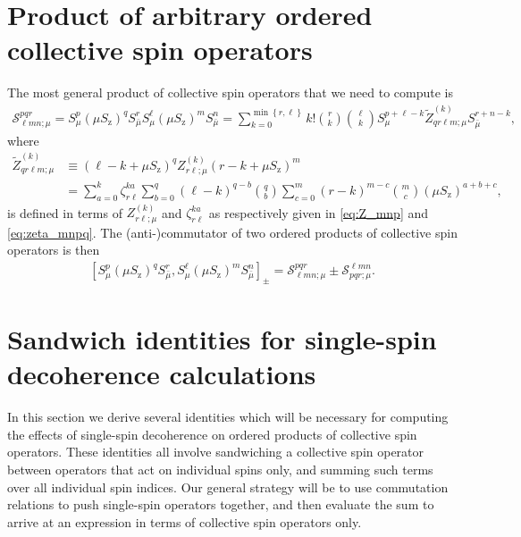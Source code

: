 \documentclass[aps,11pt,notitlepage,nofootinbib,longbibliography]{revtex4-1}
\newcommand{\p}[1]{\left(#1\right)} %
\renewcommand{\sp}[1]{\left[#1\right]} %
\renewcommand{\set}[1]{\left\{#1\right\}} %
\renewcommand{\S}{\mathcal{S}}
\newcommand{\z}{\text{z}}
\newcommand{\bmu}{{\bar\mu}}
\newcommand{\1}{\mathds{1}}
\begin{document}
\section{Product of arbitrary ordered collective spin operators}
\label{sec:prod_general}

The most general product of collective spin operators that we need to
compute is
\begin{align}
  \S^{pqr}_{\ell mn;\mu}
  = S_\mu^p \p{\mu S_\z}^q S_\bmu^r
  S_\mu^\ell \p{\mu S_\z}^m S_\bmu^n
  = \sum_{k=0}^{\min\set{r,\ell}} k! { r \choose k } { \ell \choose k }
  S_\mu^{p+\ell-k} \tilde Z_{qr\ell m;\mu}^{(k)} S_\bmu^{r+n-k},
  \label{eq:general_product}
\end{align}
where
\begin{align}
  \tilde Z_{qr\ell m;\mu}^{(k)}
  &\equiv \p{\ell-k+\mu S_\z}^q
  Z_{r\ell;\mu}^{(k)} \p{r-k+\mu S_\z}^m \\
  &= \sum_{a=0}^k \zeta_{r\ell}^{ka}
  \sum_{b=0}^q \p{\ell-k}^{q-b} { q \choose b }
  \sum_{c=0}^m \p{r-k}^{m-c} { m \choose c }
  \p{\mu S_\z}^{a+b+c},
\end{align}
is defined in terms of $Z_{r\ell;\mu}^{(k)}$ and $\zeta_{r\ell}^{ka}$
as respectively given in \eqref{eq:Z_mnp} and \eqref{eq:zeta_mnpq}.
The (anti-)commutator of two ordered products of collective spin
operators is then
\begin{align}
  \sp{S_\mu^p \p{\mu S_\z}^q S_\bmu^r,
    S_\mu^\ell \p{\mu S_\z}^m S_\bmu^n}_\pm
  = \S^{pqr}_{\ell mn;\mu} \pm \S^{\ell mn}_{pqr;\mu}.
\end{align}


\section{Sandwich identities for single-spin decoherence calculations}
\label{sec:sandwich_single}

In this section we derive several identities which will be necessary
for computing the effects of single-spin decoherence on ordered
products of collective spin operators.  These identities all involve
sandwiching a collective spin operator between operators that act on
individual spins only, and summing such terms over all individual spin
indices.  Our general strategy will be to use commutation relations to
push single-spin operators together, and then evaluate the sum to
arrive at an expression in terms of collective spin operators only.
\end{document}
